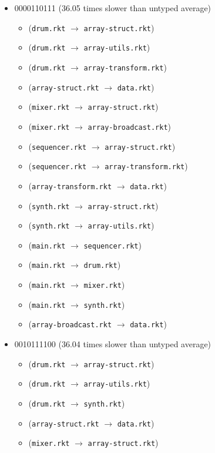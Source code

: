 \documentclass{article}
\newcommand{\mono}[1]{\texttt{#1}}
\begin{document}
\begin{itemize}
\begin{itemize}
  \end{itemize}
\item 0000110111 (36.05 times slower than untyped average)
  \begin{itemize}
  \item (\mono{drum.rkt} $\rightarrow$ \mono{array-struct.rkt})
  \item (\mono{drum.rkt} $\rightarrow$ \mono{array-utils.rkt})
  \item (\mono{drum.rkt} $\rightarrow$ \mono{array-transform.rkt})
  \item (\mono{array-struct.rkt} $\rightarrow$ \mono{data.rkt})
  \item (\mono{mixer.rkt} $\rightarrow$ \mono{array-struct.rkt})
  \item (\mono{mixer.rkt} $\rightarrow$ \mono{array-broadcast.rkt})
  \item (\mono{sequencer.rkt} $\rightarrow$ \mono{array-struct.rkt})
  \item (\mono{sequencer.rkt} $\rightarrow$ \mono{array-transform.rkt})
  \item (\mono{array-transform.rkt} $\rightarrow$ \mono{data.rkt})
  \item (\mono{synth.rkt} $\rightarrow$ \mono{array-struct.rkt})
  \item (\mono{synth.rkt} $\rightarrow$ \mono{array-utils.rkt})
  \item (\mono{main.rkt} $\rightarrow$ \mono{sequencer.rkt})
  \item (\mono{main.rkt} $\rightarrow$ \mono{drum.rkt})
  \item (\mono{main.rkt} $\rightarrow$ \mono{mixer.rkt})
  \item (\mono{main.rkt} $\rightarrow$ \mono{synth.rkt})
  \item (\mono{array-broadcast.rkt} $\rightarrow$ \mono{data.rkt})
  \end{itemize}
\item 0010111100 (36.04 times slower than untyped average)
  \begin{itemize}
  \item (\mono{drum.rkt} $\rightarrow$ \mono{array-struct.rkt})
  \item (\mono{drum.rkt} $\rightarrow$ \mono{array-utils.rkt})
  \item (\mono{drum.rkt} $\rightarrow$ \mono{synth.rkt})
  \item (\mono{array-struct.rkt} $\rightarrow$ \mono{data.rkt})
  \item (\mono{mixer.rkt} $\rightarrow$ \mono{array-struct.rkt})

\end{itemize}
\end{itemize}
\end{document}
